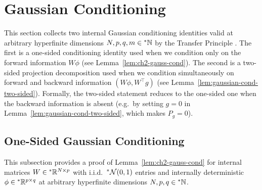 \section{Gaussian Conditioning}
\label{sec:appa-gaussian-cond}

This section collects two internal Gaussian conditioning identities valid at arbitrary hyperfinite dimensions $N, p, q, m \in {}^*\mathbb{N}$ by the Transfer Principle \cite{robinson1966nonstandard,goldblatt1998lectures}. The first is a one-sided conditioning identity used when we condition only on the forward information $W\phi$ (see Lemma~\ref{lem:ch2-gauss-cond}).
The second is a two-sided projection decomposition used when we condition simultaneously on forward and backward information $(W\phi, W^\top g)$ (see Lemma~\ref{lem:gaussian-cond-two-sided}). Formally, the two-sided statement reduces to the one-sided one when the backward information is absent (e.g.\ by setting $g = 0$ in Lemma~\ref{lem:gaussian-cond-two-sided}, which makes $P_g = 0$).

\subsection{One-Sided Gaussian Conditioning}
\label{subsec:appa-one-sided}

This subsection provides a proof of Lemma~\ref{lem:ch2-gauss-cond}
for internal matrices $W \in {}^*\mathbb{R}^{N \times p}$ with i.i.d.\ ${}^*\mathcal{N}(0, 1)$ entries and internally deterministic $\phi \in {}^*\mathbb{R}^{p \times q}$ at arbitrary hyperfinite dimensions $N, p, q \in {}^*\mathbb{N}$.

